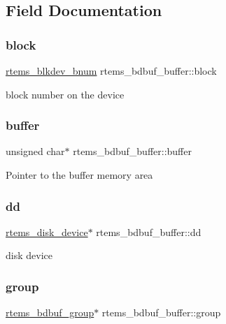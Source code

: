 \subsection{Field Documentation}
\mbox{\label{structrtems__bdbuf__buffer_a5d67de9a2fe5257419575b98b26d7bca}} 
\subsubsection{\texorpdfstring{block}{block}}
{\footnotesize\ttfamily \mbox{\hyperlink{group__rtems__disk_ga5fbcfd40b657bff6c54d9e393fab3274}{rtems\+\_\+blkdev\+\_\+bnum}} rtems\+\_\+bdbuf\+\_\+buffer\+::block}

block number on the device \mbox{\label{structrtems__bdbuf__buffer_a501e0c67a7da6ca60fb570b338599d89}} 
\subsubsection{\texorpdfstring{buffer}{buffer}}
{\footnotesize\ttfamily unsigned char$\ast$ rtems\+\_\+bdbuf\+\_\+buffer\+::buffer}

Pointer to the buffer memory area \mbox{\label{structrtems__bdbuf__buffer_a30a0b9fb07a8e1debae704dbe2b06dd0}} 
\subsubsection{\texorpdfstring{dd}{dd}}
{\footnotesize\ttfamily \mbox{\hyperlink{structrtems__disk__device}{rtems\+\_\+disk\+\_\+device}}$\ast$ rtems\+\_\+bdbuf\+\_\+buffer\+::dd}

disk device \mbox{\label{structrtems__bdbuf__buffer_ac3f028ff82e1d2a5a5068106ea531037}} 
\subsubsection{\texorpdfstring{group}{group}}
{\footnotesize\ttfamily \mbox{\hyperlink{structrtems__bdbuf__group}{rtems\+\_\+bdbuf\+\_\+group}}$\ast$ rtems\+\_\+bdbuf\+\_\+buffer\+::group}

